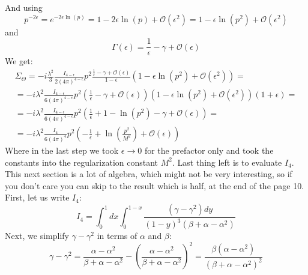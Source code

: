 \documentclass{article}
\begin{document}
And using
\begin{equation}
    p^{-2\epsilon} = e^{-2\epsilon\ln(p)} = 1 - 2\epsilon \ln(p) + \mathcal{O}(\epsilon^2) = 1 - \epsilon \ln(p^2) + \mathcal{O}(\epsilon^2)
\end{equation}
and
\begin{equation}
    \Gamma(\epsilon) = \frac{1}{\epsilon} - \gamma + \mathcal{O}(\epsilon)
\end{equation}
We get:
\begin{equation}
\begin{gathered}
    \Sigma_\Theta = -i\frac{\lambda^2}{3} \frac{I_{4 - \epsilon}}{2(4\pi)^{4 - \epsilon}} p^2 \frac{\frac{1}{\epsilon} - \gamma + \mathcal{O}(\epsilon)}{1 - \epsilon}\left( 1 - \epsilon \ln(p^2) + \mathcal{O}(\epsilon^2)\right) = \\ =
    -i\lambda^2 \frac{I_{4 - \epsilon}}{6(4\pi)^{4 - \epsilon}} p^2 \left(\frac{1}{\epsilon} - \gamma + \mathcal{O}(\epsilon)\right)\left( 1 - \epsilon \ln(p^2) + \mathcal{O}(\epsilon^2)\right)\left(1 + \epsilon\right) = \\ =
    -i\lambda^2 \frac{I_{4 - \epsilon}}{6(4\pi)^{4 - \epsilon}} p^2 \left(\frac{1}{\epsilon} + 1 - \ln(p^2) - \gamma + \mathcal{O}(\epsilon)\right) = \\ =
    -i\lambda^2 \frac{I_4}{6(4\pi)^4} p^2 \left(-\frac{1}{\epsilon} + \ln(\frac{p^2}{M^2}) + \mathcal{O}(\epsilon)\right)
\end{gathered}
\end{equation}
Where in the last step we took $\epsilon \rightarrow 0$ for the prefactor only and took the constants into the regularization constant $M^2$. Last thing left is to evaluate $I_4$.
\newline
This next section is a lot of algebra, which might not be very interesting, so if you don't care you can skip to the result which is half, at the end of the page 10.
\newline
First, let us write $I_4$:
\begin{equation}
    I_4 = \int_0^1 dx \int_0^{1-x} \frac{\left(\gamma - \gamma^2\right)dy}{(1 - y)^3(\beta + \alpha - \alpha^2)}
\end{equation}
Next, we simplify $\gamma - \gamma^2$ in terms of $\alpha$ and $\beta$:
\begin{equation}
    \gamma - \gamma^2 = \frac{\alpha - \alpha^2}{\beta + \alpha - \alpha^2} - \left(\frac{\alpha - \alpha^2}{\beta + \alpha - \alpha^2}\right)^2 = \frac{\beta\left(\alpha - \alpha^2\right)}{\left(\beta + \alpha - \alpha^2\right)^2}
\end{equation}
\end{document}
